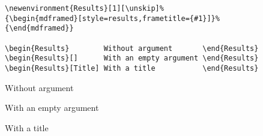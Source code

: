 \begin{LaTeXsource}[Environments]
\begin{verbatim}
\newenvironment{Results}[1][\unskip]%
{\begin{mdframed}[style=results,frametitle={#1}]}%
{\end{mdframed}}

\begin{Results}        Without argument       \end{Results}
\begin{Results}[]      With an empty argument \end{Results}
\begin{Results}[Title] With a title           \end{Results}
\end{verbatim}
\end{LaTeXsource}

\begin{Results}
Without argument
\end{Results}

\begin{Results}[]
With an empty argument
\end{Results}

\begin{Results}
With a title
\end{Results}
